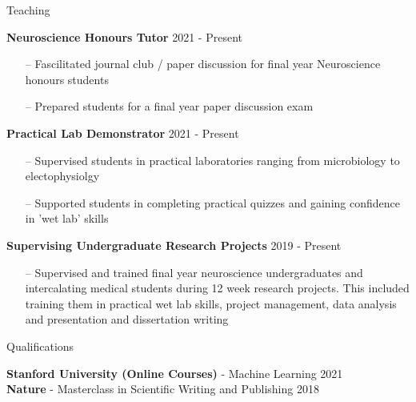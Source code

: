 \documentclass{resume} %
\begin{document}

\begin{rSection}{Teaching}

{\textbf{Neuroscience Honours Tutor} \hfill{2021 - Present}}
\begin{itemize}
    \item [--] Fascilitated journal club / paper discussion for final year Neuroscience honours students
    \item [--] Prepared students for a final year paper discussion exam
\end{itemize}

{\textbf{Practical Lab Demonstrator} \hfill{2021 - Present}}
\begin{itemize}
    \item [--] Supervised students in practical laboratories ranging from microbiology to electophysiolgy
    \item [--] Supported students in completing practical quizzes and gaining confidence in 'wet lab' skills
\end{itemize}

{\textbf{Supervising Undergraduate Research Projects} \hfill{2019 - Present}}
\begin{itemize}
    \item [--] Supervised and trained final year neuroscience undergraduates and intercalating medical students during 12 week research projects. This included training them in practical wet lab skills, project management, data analysis and presentation and dissertation writing
\end{itemize}
\end{rSection}



\begin{rSection}{Qualifications}

\textbf{Stanford University (Online Courses)} - Machine Learning \hfill{2021}\\
\textbf{Nature} - Masterclass in Scientific Writing and Publishing \hfill{2018}\\ 

\end{rSection}
\end{document}
